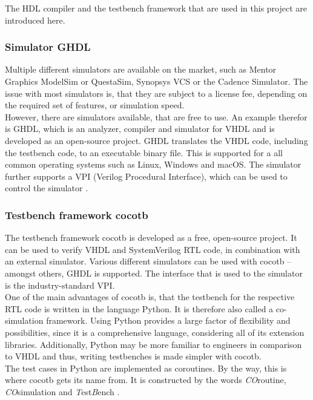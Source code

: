 The HDL compiler and the testbench framework that are used in this project are introduced here.

\subsubsection{Simulator GHDL}

Multiple different simulators are available on the market, such as Mentor Graphics \mbox{ModelSim} or QuestaSim, Synopsys VCS or the Cadence Simulator.
The issue with most simulators is, that they are subject to a license fee, depending on the required set of features, or simulation speed.\\

However, there are simulators available, that are free to use.
An example therefor is GHDL, which is an analyzer, compiler and simulator for VHDL and is developed as an open-source project.
GHDL translates the VHDL code, including the testbench code, to an executable binary file.
This is supported for a all common operating systems such as Linux, Windows and macOS.
The simulator further supports a VPI (Verilog Procedural Interface), which can be used to control the simulator \cite{GHDLDoc}.

\subsubsection{Testbench framework cocotb}
\label{sub:VHDL:FrameworkCocotb}

The testbench framework cocotb is developed as a free, open-source project.
It can be used to verify VHDL and SystemVerilog RTL code, in combination with an external simulator.
Various different simulators can be used with cocotb -- amongst others, GHDL is supported.
The interface that is used to the simulator is the industry-standard VPI.\\

One of the main advantages of cocotb is, that the testbench for the respective RTL code is written in the language Python.
It is therefore also called a co-simulation framework.
Using Python provides a large factor of flexibility and possibilities, since it is a comprehensive language, considering all of its extension libraries.
Additionally, Python may be more familiar to engineers in comparison to VHDL and thus, writing testbenches is made simpler with cocotb.\\

The test cases in Python are implemented as coroutines.
By the way, this is where cocotb gets its name from.
It is constructed by the words \textit{CO}routine, \textit{CO}simulation and \textit{T}est\textit{B}ench \cite{cocotbDoc}.\\


